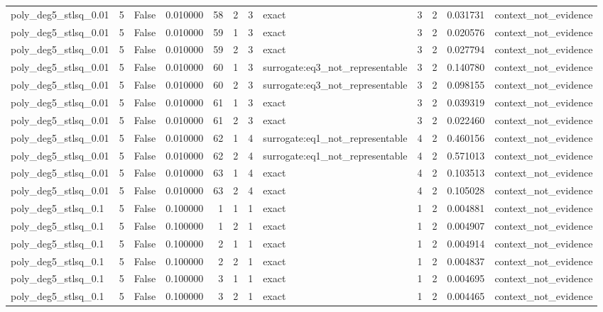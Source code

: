 \begin{tabular}{lrrrrrrlrrrl}
poly\_deg5\_stlsq\_0.01 & 5 & False & 0.010000 & 58 & 2 & 3 & exact & 3 & 2 & 0.031731 & context\_not\_evidence \\
poly\_deg5\_stlsq\_0.01 & 5 & False & 0.010000 & 59 & 1 & 3 & exact & 3 & 2 & 0.020576 & context\_not\_evidence \\
poly\_deg5\_stlsq\_0.01 & 5 & False & 0.010000 & 59 & 2 & 3 & exact & 3 & 2 & 0.027794 & context\_not\_evidence \\
poly\_deg5\_stlsq\_0.01 & 5 & False & 0.010000 & 60 & 1 & 3 & surrogate:eq3\_not\_representable & 3 & 2 & 0.140780 & context\_not\_evidence \\
poly\_deg5\_stlsq\_0.01 & 5 & False & 0.010000 & 60 & 2 & 3 & surrogate:eq3\_not\_representable & 3 & 2 & 0.098155 & context\_not\_evidence \\
poly\_deg5\_stlsq\_0.01 & 5 & False & 0.010000 & 61 & 1 & 3 & exact & 3 & 2 & 0.039319 & context\_not\_evidence \\
poly\_deg5\_stlsq\_0.01 & 5 & False & 0.010000 & 61 & 2 & 3 & exact & 3 & 2 & 0.022460 & context\_not\_evidence \\
poly\_deg5\_stlsq\_0.01 & 5 & False & 0.010000 & 62 & 1 & 4 & surrogate:eq1\_not\_representable & 4 & 2 & 0.460156 & context\_not\_evidence \\
poly\_deg5\_stlsq\_0.01 & 5 & False & 0.010000 & 62 & 2 & 4 & surrogate:eq1\_not\_representable & 4 & 2 & 0.571013 & context\_not\_evidence \\
poly\_deg5\_stlsq\_0.01 & 5 & False & 0.010000 & 63 & 1 & 4 & exact & 4 & 2 & 0.103513 & context\_not\_evidence \\
poly\_deg5\_stlsq\_0.01 & 5 & False & 0.010000 & 63 & 2 & 4 & exact & 4 & 2 & 0.105028 & context\_not\_evidence \\
poly\_deg5\_stlsq\_0.1 & 5 & False & 0.100000 & 1 & 1 & 1 & exact & 1 & 2 & 0.004881 & context\_not\_evidence \\
poly\_deg5\_stlsq\_0.1 & 5 & False & 0.100000 & 1 & 2 & 1 & exact & 1 & 2 & 0.004907 & context\_not\_evidence \\
poly\_deg5\_stlsq\_0.1 & 5 & False & 0.100000 & 2 & 1 & 1 & exact & 1 & 2 & 0.004914 & context\_not\_evidence \\
poly\_deg5\_stlsq\_0.1 & 5 & False & 0.100000 & 2 & 2 & 1 & exact & 1 & 2 & 0.004837 & context\_not\_evidence \\
poly\_deg5\_stlsq\_0.1 & 5 & False & 0.100000 & 3 & 1 & 1 & exact & 1 & 2 & 0.004695 & context\_not\_evidence \\
poly\_deg5\_stlsq\_0.1 & 5 & False & 0.100000 & 3 & 2 & 1 & exact & 1 & 2 & 0.004465 & context\_not\_evidence \\

\end{tabular}
